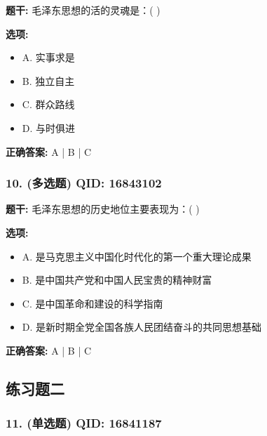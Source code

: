 \documentclass[12pt,UTF8]{ctexart}
\begin{document}
\textbf{题干:}
毛泽东思想的活的灵魂是：( )

\textbf{选项:}
\begin{itemize}[leftmargin=*]

  \item A. 实事求是

  \item B. 独立自主

  \item C. 群众路线

  \item D. 与时俱进

\end{itemize}

\textbf{正确答案:}
A | B | C

\vspace{0.3em}\hrulefill\vspace{0.7em}

\subsubsection*{10. (多选题) \small QID: 16843102}

\textbf{题干:}
毛泽东思想的历史地位主要表现为：( )

\textbf{选项:}
\begin{itemize}[leftmargin=*]

  \item A. 是马克思主义中国化时代化的第一个重大理论成果

  \item B. 是中国共产党和中国人民宝贵的精神财富

  \item C. 是中国革命和建设的科学指南

  \item D. 是新时期全党全国各族人民团结奋斗的共同思想基础

\end{itemize}

\textbf{正确答案:}
A | B | C

\vspace{0.3em}\hrulefill\vspace{0.7em}

\subsection*{练习题二}

\subsubsection*{11. (单选题) \small QID: 16841187}
\end{document}
